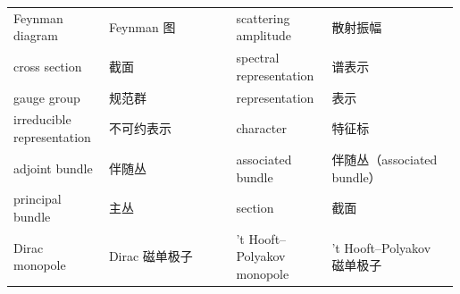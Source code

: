 \begin{longtable}{@{}p{0.215\linewidth}p{0.28\linewidth}p{0.215\linewidth}p{0.28\linewidth}@{}}
Feynman diagram & Feynman 图 & scattering amplitude & 散射振幅 \\
cross section & 截面 & spectral representation & 谱表示 \\
gauge group & 规范群 & representation & 表示 \\
irreducible representation & 不可约表示 & character & 特征标 \\
adjoint bundle & 伴随丛 & associated bundle & 伴随丛（associated bundle） \\
principal bundle & 主丛 & section & 截面 \\
Dirac monopole & Dirac 磁单极子 & 't Hooft--Polyakov monopole & 't Hooft--Polyakov 磁单极子 \\
\end{longtable}
